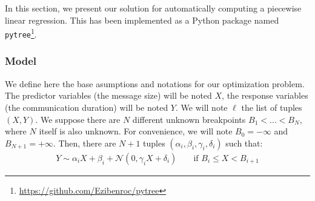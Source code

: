             In this section, we present our solution for automatically computing a piecewise linear regression. This has
            been implemented as a Python package named
            \texttt{pytree}\footnote{\url{https://github.com/Ezibenroc/pytree}}.

            \subsubsection{Model}%

                We define here the base asumptions and notations for our optimization problem. The predictor variables
                (\eg the message size) will be noted \(X\), the response variables (\eg the communication duration) will
                be noted \(Y\). We will note \(\ell\) the list of tuples \((X,Y)\). We suppose there are \(N\) different
                unknown breakpoints \(B_1 < \dots < B_N\), where \(N\) itself is also unknown. For convenience, we will
                note \(B_0=-\infty\) and \(B_{N+1} = +\infty\).  Then, there are \(N+1\) tuples \((\alpha_i, \beta_i,
                \gamma_i, \delta_i)\) such that:
                \begin{align}\label{eqn:prediction:pytree_model}
                    Y \sim \alpha_i X + \beta_i + \mathcal{N}\left(0, \gamma_i X + \delta_i\right)
                        && \text{ if } B_i \leq X < B_{i+1}
                \end{align}

